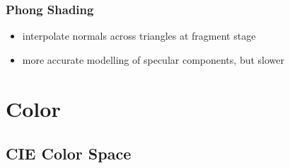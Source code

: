 \documentclass[twocolumn,landscape,10pt]{article}
\theoremstyle{definition}
\begin{document}
\subsubsection{Phong Shading}

\begin{itemize}
    \item interpolate normals across triangles at fragment stage
    \item more accurate modelling of specular components, but slower
\end{itemize} 


\section{Color}

\subsection{CIE Color Space}
\end{document}
